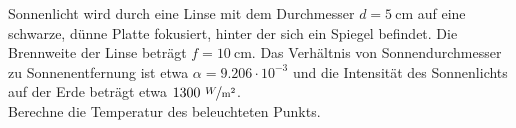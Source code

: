 \begin{Exercise}[label = cws, origin = Est.-Fin.-Auswahlklausur, title = Kochen mit der Sonne, difficulty = 4]
	Sonnenlicht wird durch eine Linse mit dem Durchmesser $d = 5~\mathrm{cm}$ auf eine schwarze, dünne Platte fokusiert, hinter der sich ein Spiegel befindet. Die Brennweite der Linse beträgt $f = 10~\mathrm{cm}$. Das Verhältnis von Sonnendurchmesser zu Sonnenentfernung ist etwa $\alpha=9.206\cdot10^{-3}$ und die Intensität des Sonnenlichts auf der Erde beträgt etwa $1300~\mathrm{\nicefrac{W}{m^2}}$.\\
	Berechne die Temperatur des beleuchteten Punkts.
 \end{Exercise}